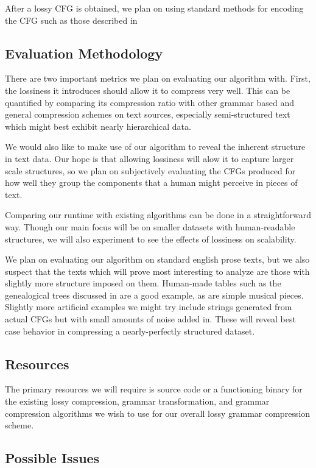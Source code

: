 \documentclass[11pt]{article}
\begin{document}
After a lossy CFG is obtained, we plan on using standard methods for encoding
the CFG such as those described in \cite{sequitur2}

\subsection{Evaluation Methodology}

There are two important metrics we plan on evaluating our algorithm with.
First, the lossiness it introduces should allow it to compress very well. This
can be quantified by comparing its compression ratio with other grammar based
and general compression schemes on text sources, especially semi-structured
text which might best exhibit nearly hierarchical data.

We would also like to make use of our algorithm to reveal the inherent
structure in text data. Our hope is that allowing lossiness will alow it to
capture larger scale structures, so we plan on subjectively evaluating the CFGs
produced for how well they group the components that a human might perceive in
pieces of text.

Comparing our runtime with existing algorithms can be done in a straightforward
way. Though our main focus will be on smaller datasets with human-readable
structures, we will also experiment to see the effects of lossiness on
scalability.

We plan on evaluating our algorithm on standard english prose texts, but we
also suspect that the texts which will prove most interesting to analyze are
those with slightly more structure imposed on them. Human-made tables such as
the genealogical trees discussed in \cite{nevillphd} are a good example, as are
simple musical pieces. Slightly more artificial examples we might try include
strings generated from actual CFGs but with small amounts of noise added in.
These will reveal best case behavior in compressing a nearly-perfectly
structured dataset.

\subsection{Resources}

The primary resources we will require is source code or a functioning binary
for the existing lossy compression, grammar transformation, and grammar
compression algorithms we wish to use for our overall lossy grammar compression
scheme.

\subsection{Possible Issues}

\nocite{*}


\end{document}
